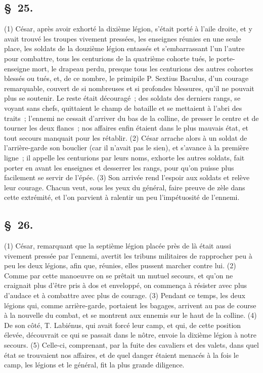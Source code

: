 \documentclass[french,twoside]{book} %
\begin{document}
\subsection[{§ 25.}]{ \textsc{§ 25.} }
\noindent (1) César, après avoir exhorté la dixième légion, s’était porté à l’aile droite, et y avait trouvé les troupes vivement pressées, les enseignes réunies en une seule place, les soldats de la douzième légion entassés et s’embarrassant l’un l’autre pour combattre, tous les centurions de la quatrième cohorte tués, le porte-enseigne mort, le drapeau perdu, presque tous les centurions des autres cohortes blessés ou tués, et, de ce nombre, le primipile P. Sextius Baculus, d’un courage remarquable, couvert de si nombreuses et si profondes blessures, qu’il ne pouvait plus se soutenir. Le reste était découragé ; des soldats des derniers rangs, se voyant sans chefs, quittaient le champ de bataille et se mettaient à l’abri des traits ; l’ennemi ne cessait d’arriver du bas de la colline, de presser le centre et de tourner les deux flancs ; nos affaires enfin étaient dans le plus mauvais état, et tout secours manquait pour les rétablir. (2) César arrache alors à un soldat de l’arrière-garde son bouclier (car il n’avait pas le sien), et s’avance à la première ligne ; il appelle les centurions par leurs noms, exhorte les autres soldats, fait porter en avant les enseignes et desserrer les rangs, pour qu’on puisse plus facilement se servir de l’épée. (3) Son arrivée rend l’espoir aux soldats et relève leur courage. Chacun veut, sous les yeux du général, faire preuve de zèle dans cette extrémité, et l’on parvient à ralentir un peu l’impétuosité de l’ennemi.
\subsection[{§ 26.}]{ \textsc{§ 26.} }
\noindent (1) César, remarquant que la septième légion placée près de là était aussi vivement pressée par l’ennemi, avertit les tribuns militaires de rapprocher peu à peu les deux légions, afin que, réunies, elles pussent marcher contre lui. (2) Comme par cette manoeuvre on se prêtait un mutuel secours, et qu’on ne craignait plus d’être pris à dos et enveloppé, on commença à résister avec plus d’audace et à combattre avec plus de courage. (3) Pendant ce temps, les deux légions qui, comme arrière-garde, portaient les bagages, arrivent au pas de course à la nouvelle du combat, et se montrent aux ennemis sur le haut de la colline. (4) De son côté, T. Labiénus, qui avait forcé leur camp, et qui, de cette position élevée, découvrait ce qui se passait dans le nôtre, envoie la dixième légion à notre secours. (5) Celle-ci, comprenant, par la fuite des cavaliers et des valets, dans quel état se trouvaient nos affaires, et de quel danger étaient menacés à la fois le camp, les légions et le général, fit la plus grande diligence.
\end{document}
